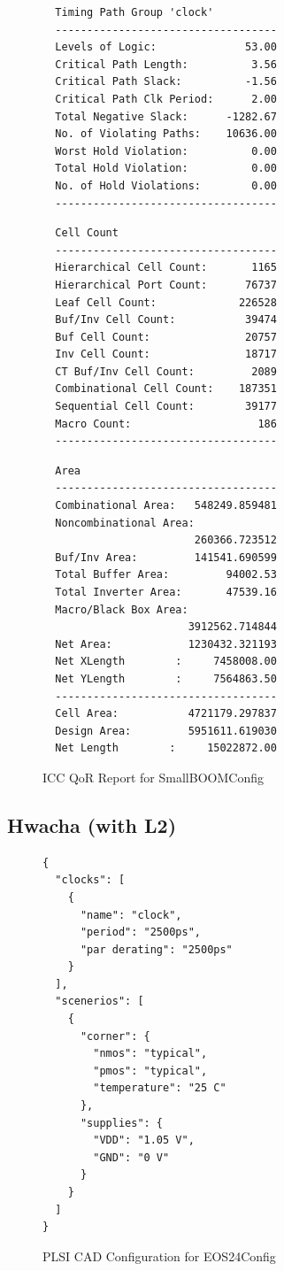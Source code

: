 \documentclass{article}
\begin{document}
\begin{figure}
\begin{multicols}{2}
\begin{verbatim}
  Timing Path Group 'clock'
  -----------------------------------
  Levels of Logic:              53.00
  Critical Path Length:          3.56
  Critical Path Slack:          -1.56
  Critical Path Clk Period:      2.00
  Total Negative Slack:      -1282.67
  No. of Violating Paths:    10636.00
  Worst Hold Violation:          0.00
  Total Hold Violation:          0.00
  No. of Hold Violations:        0.00
  -----------------------------------
\end{verbatim}

\begin{verbatim}
  Cell Count
  -----------------------------------
  Hierarchical Cell Count:       1165
  Hierarchical Port Count:      76737
  Leaf Cell Count:             226528
  Buf/Inv Cell Count:           39474
  Buf Cell Count:               20757
  Inv Cell Count:               18717
  CT Buf/Inv Cell Count:         2089
  Combinational Cell Count:    187351
  Sequential Cell Count:        39177
  Macro Count:                    186
  -----------------------------------
\end{verbatim}

\begin{verbatim}
  Area
  -----------------------------------
  Combinational Area:   548249.859481
  Noncombinational Area:
                        260366.723512
  Buf/Inv Area:         141541.690599
  Total Buffer Area:         94002.53
  Total Inverter Area:       47539.16
  Macro/Black Box Area:
                       3912562.714844
  Net Area:            1230432.321193
  Net XLength        :     7458008.00
  Net YLength        :     7564863.50
  -----------------------------------
  Cell Area:           4721179.297837
  Design Area:         5951611.619030
  Net Length        :     15022872.00
\end{verbatim}
\end{multicols}
  \caption{ICC QoR Report for SmallBOOMConfig}
  \label{res:boom-qor}
\end{figure}

\clearpage
\subsection{Hwacha (with L2)}

\begin{figure}
  \begin{verbatim}
{
  "clocks": [
    {
      "name": "clock",
      "period": "2500ps",
      "par derating": "2500ps"
    }
  ],
  "scenerios": [
    {
      "corner": {
        "nmos": "typical",
        "pmos": "typical",
        "temperature": "25 C"
      },
      "supplies": {
        "VDD": "1.05 V",
        "GND": "0 V"
      }
    }
  ]
}
\end{verbatim}
  \caption{PLSI CAD Configuration for EOS24Config}
  \label{res:hwacha-config}
\end{figure}
\end{document}
